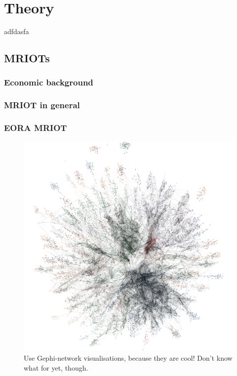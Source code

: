 \graphicspath{{./figures/}} %
\graphicspath{{./theory/figures/}} %

\chapter{Theory}
adfdasfa


\section{MRIOTs}

\subsection{Economic background}

\subsection{MRIOT in general}


\subsection{EORA MRIOT}

\begin{figure}[!h]
 \centering
 \includegraphics[width=\textwidth]{eoranet}
 \caption{Use Gephi-network visualisations, because they are cool! Don't know what for yet, though.}
\end{figure}


